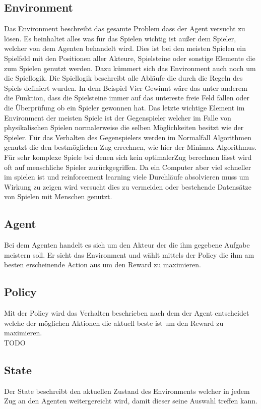 \subsection{Environment}
Das Environment beschreibt das gesamte Problem dass der Agent versucht zu lösen. Es beinhaltet alles was für das Spielen wichtig ist außer dem Spieler, welcher von dem Agenten behandelt wird.  Dies ist bei den meisten Spielen ein Spielfeld mit den Positionen aller Akteure, Spielsteine oder sonstige Elemente die zum Spielen genutzt werden. Dazu kümmert sich das Environment auch noch um die Spiellogik. Die Spiellogik beschreibt alle Abläufe die durch die Regeln des Spiels definiert wurden. In dem Beispiel Vier Gewinnt wäre das unter anderem die Funktion, dass die Spielsteine immer auf das untereste freie Feld fallen oder die Überprüfung ob ein Spieler gewonnen hat. Das letzte wichtige Element im Environment der meisten Spiele ist der Gegenspieler welcher im Falle von physikalischen Spielen normalerweise die selben Möglichkeiten besitzt wie der Spieler. Für das Verhalten des Gegenspielers werden im Normalfall Algorithmen genutzt die den bestmöglichen Zug errechnen, wie hier der Minimax Algorithmus. Für sehr komplexe Spiele bei denen sich kein optimalerZug berechnen lässt wird oft auf menschliche Spieler zurückgegriffen. Da ein Computer aber viel schneller im spielen ist und reinforcement learning viele Durchläufe absolvieren muss um Wirkung zu zeigen wird versucht dies zu vermeiden oder bestehende Datensätze von Spielen mit Menschen genutzt.\\


\subsection{Agent}
Bei dem Agenten handelt es sich um den Akteur der die ihm gegebene Aufgabe meistern soll. Er sieht das Environment und wählt mittels der Policy die ihm am besten erscheinende Action aus um den Reward zu maximieren.\\

\subsection{Policy}
Mit der Policy wird das Verhalten beschrieben nach dem der Agent entscheidet welche der möglichen Aktionen die aktuell beste ist um den Reward zu maximieren.\\
\colorbox{red!30}{TODO} %

\subsection{State}
Der State beschreibt den aktuellen Zustand des Environments welcher in jedem Zug  an den Agenten weitergereicht wird, damit dieser seine Auswahl treffen kann. 

